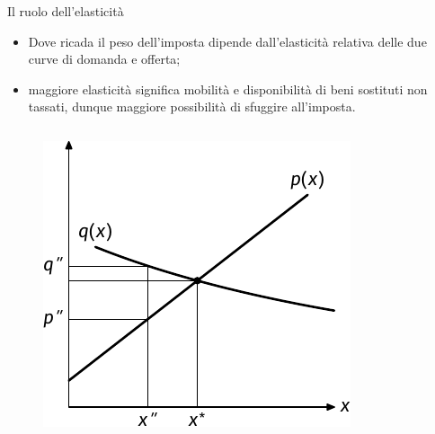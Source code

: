 \documentclass[aspectratio=64,12pt]{beamer}
\begin{document}
\begin{frame}{Il ruolo dell'elasticità}
\begin{itemize}
\item Dove ricada il peso dell'imposta dipende
dall'elasticità relativa delle due curve di domanda e offerta;
\item maggiore elasticità significa mobilità e disponibilità di beni sostituti non
tassati, dunque maggiore possibilità di sfuggire all'imposta.
\end{itemize}

\begin{columns}
\begin{column}{.45\columnwidth}
\begin{figure}[htbp]
\centering
\includegraphics[width=\textwidth]{./figure/incidenza-5.pdf}
\end{figure}
\end{column}


\end{columns}
\end{frame}
\end{document}
